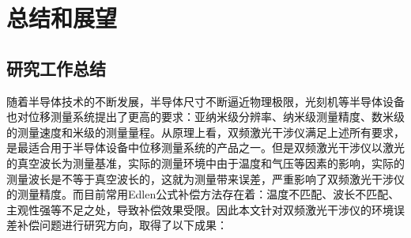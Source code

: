 \chapter{总结和展望}
\section{研究工作总结}
随着半导体技术的不断发展，半导体尺寸不断逼近物理极限，光刻机等半导体设备也对位移测量系统提出了更高的要求：亚纳米级分辨率、纳米级测量精度、数米级的测量速度和米级的测量量程。从原理上看，双频激光干涉仪满足上述所有要求，是最适合用于半导体设备中位移测量系统的产品之一。但是双频激光干涉仪以激光的真空波长为测量基准，实际的测量环境中由于温度和气压等因素的影响，实际的测量波长是不等于真空波长的，这就为测量带来误差，严重影响了双频激光干涉仪的测量精度。而目前常用Edlen公式补偿方法存在着：温度不匹配、波长不匹配、主观性强等不足之处，导致补偿效果受限。因此本文针对双频激光干涉仪的环境误差补偿问题进行研究方向，取得了以下成果：
